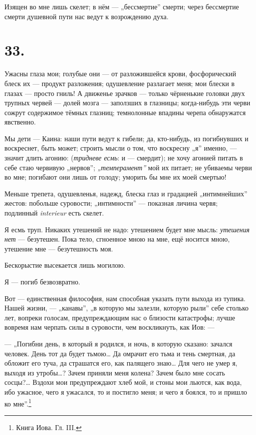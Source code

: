 \documentclass[12pt,a4paper,oneside]{book}
\begin{document}
Изящен во мне лишь скелет; в нём — „бессмертие” смерти; через бессмертие смерти душевной пути нас ведут к возрождению духа.

\section*{33.}

Ужасны глаза мои; голубые они — от разложившейся крови, фосфорический блеск их — продукт разложения; одушевление разлагает меня; мои блески в глазах — просто гниль! А движенье зрачков — только чёрненькие головки двух трупных червей — долей мозга — заползших в глазницы; когда-нибудь эти черви сожрут содержимое тёмных глазниц; темнолонные впадины черепа обнаружатся явственно.

Мы дети — Каина: наши пути ведут к гибели; да, кто-нибудь, из погибнувших и воскреснет, быть может; строить мысли о том, что воскресну „я” именно, — значит длить агонию: (\emph{тридневе есмь}: и — смердит); не хочу агонией питать в себе стаю червивую „нервов”; \emph{„темперамент”} мой их питает; не убиваемы черви во мне; погибают они лишь от голоду; уморить бы мне их моей смертью!

Меньше трепета, одушевленья, надежд, блеска глаз и градацией „интимнейших” жестов: побольше суровости; „интимности” — показная личина червя; подлинный \emph{interieur} есть скелет.

Я есмь труп. Никаких утешений не надо: утешением будет мне мысль: \emph{утешения нет} — безутешен. Пока тело, сгноенное мною на мне, ещё носится мною, утешение мне — безутешность моя.

Бескорыстие высекается лишь могилою.

Я — погиб безвозвратно.

Вот — единственная философия, нам способная указать пути выхода из тупика. Нашей жизни, — „канавы”, „в которую мы залезли, которую рыли” себе столько лет, вопреки голосам, предупреждающим нас о близости катастрофы; лучше вовремя нам черпать силы в суровости, чем воскликнуть, как Иов: —

— „Погибни день, в который я родился, и ночь, в которую сказано: зачался человек. День тот да будет тьмою… Да омрачит его тьма и тень смертная, да обложит его туча, да страшатся его, как палящего знаю… Для чего не умер я, выходя из утробы…? Зачем приняли меня колена? Зачем было мне сосать сосцы?… Вздохи мои предупреждают хлеб мой, и стоны мои льются, как вода, ибо ужасное, чего я ужасался, то и постигло меня; и чего я боялся, то и пришло ко мне”.\footnote{Книга Иова. Гл. III.}
\end{document}
